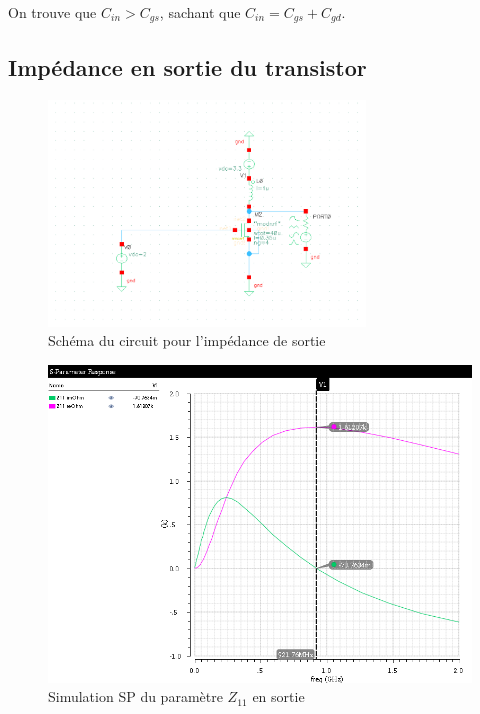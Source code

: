 \documentclass[a4paper]{article}
\begin{document}
On trouve que $C_{in} > C_{gs}$, sachant que $C_{in} = C_{gs} + C_{gd}$.

\clearpage
\subsection{Imp\'edance en sortie du transistor}

\begin{figure}[!htb]
\begin{center}
  \includegraphics[width=0.75\textwidth]{arch-transistor-output-impedance.png}
  \caption{Sch\'ema du circuit pour l'imp\'edance de sortie}
\end{center}
\end{figure}

\begin{figure}[!htb]
\begin{center}
  \includegraphics[scale=0.47]{sim-output-impedance.png}
  \caption{Simulation SP du param\`etre $Z_{11}$ en sortie}
\end{center}
\end{figure}
\end{document}
